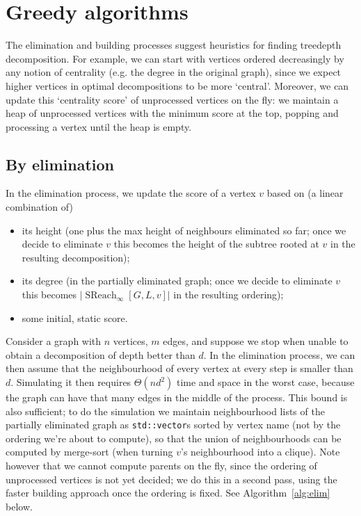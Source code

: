 \documentclass{timgad}
\DeclareMathOperator{\SReach}{SReach}
\begin{document}
\section{Greedy algorithms}
The elimination and building processes suggest heuristics for finding treedepth decomposition.
For example, we can start with vertices ordered decreasingly by any notion of centrality (e.g. the degree in the original graph), since we expect higher vertices in optimal decompositions to be more `central'.
Moreover, we can update this `centrality score' of unprocessed vertices on the fly: we maintain a heap of unprocessed vertices with the minimum score at the top, popping and processing a vertex until the heap is empty.
\subsection{By elimination}
In the elimination process, we update the score of a vertex $v$ based on (a linear combination of) 
\begin{itemize}
\item its height (one plus the max height of neighbours eliminated so far; once we decide to eliminate $v$ this becomes the height of the subtree rooted at $v$ in the resulting decomposition);
\item its degree (in the partially eliminated graph; once we decide to eliminate $v$ this becomes $|\SReach_{\infty}[G,L,v]|$ in the resulting ordering);
\item some initial, static score.
\end{itemize} 

Consider a graph with $n$ vertices, $m$ edges, and suppose we stop when unable to obtain a decomposition of depth better than $d$.
In the elimination process, we can then assume that the neighbourhood of every vertex at every step is smaller than $d$.
Simulating it then requires $\Theta(nd^2)$ time and space in the worst case,
because the graph can have that many edges in the middle of the process.
This bound is also sufficient; to do the simulation we maintain neighbourhood lists of the partially eliminated graph
as \texttt{std::vector}s sorted by vertex name (not by the ordering we're about to compute), so that the union of neighbourhoods can be computed by merge-sort (when turning $v$'s neighbourhood into a clique).
Note however that we cannot compute parents on the fly, since the ordering of unprocessed vertices is not yet decided;
we do this in a second pass, using the faster building approach once the ordering is fixed.
See Algorithm~\ref{alg:elim} below.
\end{document}
